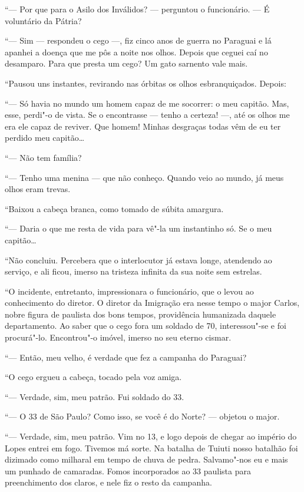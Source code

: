 ``--- Por que para o Asilo dos Inválidos? --- perguntou o funcionário.
--- É voluntário da Pátria?

``--- Sim --- respondeu o cego ---, fiz cinco anos de guerra no Paraguai
e lá apanhei a doença que me pôs a noite nos olhos. Depois que ceguei
caí no desamparo. Para que presta um cego? Um gato sarnento vale mais.

``Pausou uns instantes, revirando nas órbitas os olhos esbranquiçados.
Depois:

``--- Só havia no mundo um homem capaz de me socorrer: o meu capitão.
Mas, esse, perdi"-o de vista. Se o encontrasse --- tenho a certeza! ---,
até os olhos me era ele capaz de reviver. Que homem! Minhas desgraças
todas vêm de eu ter perdido meu capitão\ldots{}

``--- Não tem família?

``--- Tenho uma menina --- que não conheço. Quando veio ao mundo, já
meus olhos eram trevas.

``Baixou a cabeça branca, como tomado de súbita amargura.

``--- Daria o que me resta de vida para vê"-la um instantinho só. Se o
meu capitão\ldots{}

``Não concluiu. Percebera que o interlocutor já estava longe, atendendo
ao serviço, e ali ficou, imerso na tristeza infinita da sua noite sem
estrelas.

``O incidente, entretanto, impressionara o funcionário, que o levou ao
conhecimento do diretor. O diretor da Imigração era nesse tempo o major
Carlos, nobre figura de paulista dos bons tempos, providência humanizada
daquele departamento. Ao saber que o cego fora um soldado de 70,
interessou"-se e foi procurá"-lo. Encontrou"-o imóvel, imerso no seu eterno
cismar.

``--- Então, meu velho, é verdade que fez a campanha do Paraguai?

``O cego ergueu a cabeça, tocado pela voz amiga.

``--- Verdade, sim, meu patrão. Fui soldado do 33.

``--- O 33 de São Paulo? Como isso, se você é do Norte? --- objetou o
major.

``--- Verdade, sim, meu patrão. Vim no 13, e logo depois de chegar ao
império do Lopes entrei em fogo. Tivemos má sorte. Na batalha de Tuiuti
nosso batalhão foi dizimado como milharal em tempo de chuva de pedra.
Salvamo"-nos eu e mais um punhado de camaradas. Fomos incorporados ao 33
paulista para preenchimento dos claros, e nele fiz o resto da campanha.

